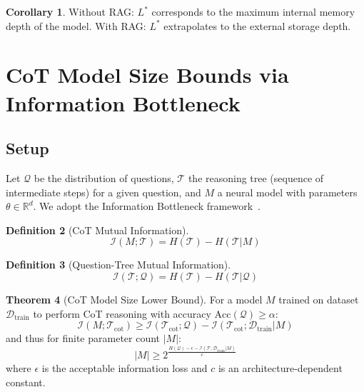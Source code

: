 \documentclass[12pt]{article}
\theoremstyle{definition}
\newtheorem{definition}{Definition}[section]
\newtheorem{theorem}[definition]{Theorem}
\newtheorem{corollary}[definition]{Corollary}
\theoremstyle{remark}
\begin{document}
\begin{corollary}
Without RAG: $L^*$ corresponds to the maximum internal memory depth of the model. With RAG: $L^*$ extrapolates to the external storage depth.
\end{corollary}

\section{CoT Model Size Bounds via Information Bottleneck}

\subsection{Setup}

Let $\mathcal{Q}$ be the distribution of questions, $\mathcal{T}$ the reasoning tree (sequence of intermediate steps) for a given question, and $M$ a neural model with parameters $\theta \in \mathbb{R}^d$. We adopt the Information Bottleneck framework~\cite{tishby2000information}.

\begin{definition}[CoT Mutual Information]
\begin{equation}
\mathcal{I}(M; \mathcal{T}) = H(\mathcal{T}) - H(\mathcal{T} | M)
\end{equation}
\end{definition}

\begin{definition}[Question-Tree Mutual Information]
\begin{equation}
\mathcal{I}(\mathcal{T}; \mathcal{Q}) = H(\mathcal{T}) - H(\mathcal{T} | \mathcal{Q})
\end{equation}
\end{definition}

\begin{theorem}[CoT Model Size Lower Bound]\label{thm:cot-bound}
For a model $M$ trained on dataset $\mathcal{D}_{\mathrm{train}}$ to perform CoT reasoning with accuracy $\mathrm{Acc}(\mathcal{Q}) \geq \alpha$:
\begin{equation}
\mathcal{I}(M; \mathcal{T}_{\mathrm{cot}}) \geq \mathcal{I}(\mathcal{T}_{\mathrm{cot}}; \mathcal{Q}) - \mathcal{I}(\mathcal{T}_{\mathrm{cot}}; \mathcal{D}_{\mathrm{train}} | M)
\end{equation}
and thus for finite parameter count $|M|$:
\begin{equation}
|M| \geq 2^{\frac{H(\mathcal{Q}) - \epsilon - \mathcal{I}(\mathcal{T}; \mathcal{D}_{\mathrm{train}} | M)}{c}}
\end{equation}
where $\epsilon$ is the acceptable information loss and $c$ is an architecture-dependent constant.
\end{theorem}
\end{document}
